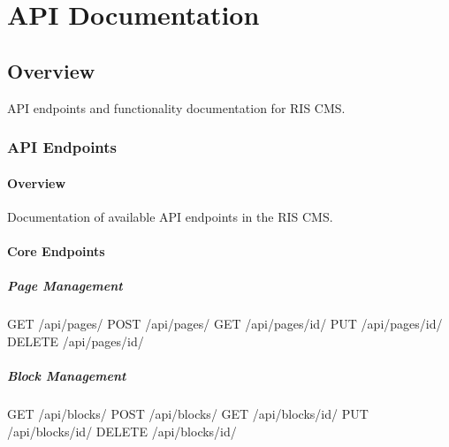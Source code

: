 \documentclass[letterpaper,10pt,english]{sphinxmanual}
\begin{document}
\section{API Documentation}
\label{\detokenize{api/index:api-documentation}}\label{\detokenize{api/index::doc}}

\subsection{Overview}
\label{\detokenize{api/index:overview}}
\sphinxAtStartPar
API endpoints and functionality documentation for RIS CMS.

\sphinxstepscope


\subsubsection{API Endpoints}
\label{\detokenize{api/endpoints:api-endpoints}}\label{\detokenize{api/endpoints::doc}}

\paragraph{Overview}
\label{\detokenize{api/endpoints:overview}}
\sphinxAtStartPar
Documentation of available API endpoints in the RIS CMS.


\paragraph{Core Endpoints}
\label{\detokenize{api/endpoints:core-endpoints}}

\subparagraph{Page Management}
\label{\detokenize{api/endpoints:page-management}}
\begin{sphinxVerbatim}[commandchars=\\\{\}]
GET /api/pages/
POST /api/pages/
GET /api/pages/\PYGZlt{}id\PYGZgt{}/
PUT /api/pages/\PYGZlt{}id\PYGZgt{}/
DELETE /api/pages/\PYGZlt{}id\PYGZgt{}/
\end{sphinxVerbatim}


\subparagraph{Block Management}
\label{\detokenize{api/endpoints:block-management}}
\begin{sphinxVerbatim}[commandchars=\\\{\}]
GET /api/blocks/
POST /api/blocks/
GET /api/blocks/\PYGZlt{}id\PYGZgt{}/
PUT /api/blocks/\PYGZlt{}id\PYGZgt{}/
DELETE /api/blocks/\PYGZlt{}id\PYGZgt{}/
\end{sphinxVerbatim}

\sphinxstepscope
\end{document}
